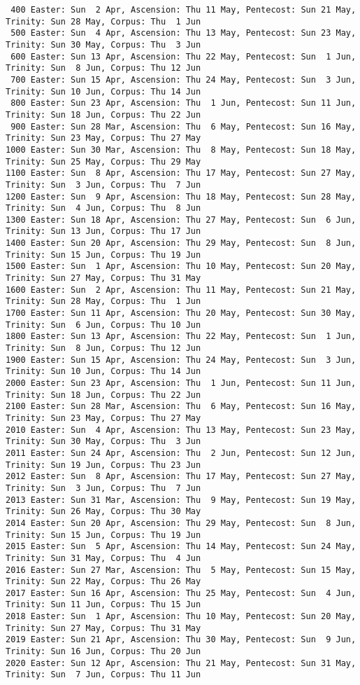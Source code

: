 \begin{verbatim}
 400 Easter: Sun  2 Apr, Ascension: Thu 11 May, Pentecost: Sun 21 May, Trinity: Sun 28 May, Corpus: Thu  1 Jun
 500 Easter: Sun  4 Apr, Ascension: Thu 13 May, Pentecost: Sun 23 May, Trinity: Sun 30 May, Corpus: Thu  3 Jun
 600 Easter: Sun 13 Apr, Ascension: Thu 22 May, Pentecost: Sun  1 Jun, Trinity: Sun  8 Jun, Corpus: Thu 12 Jun
 700 Easter: Sun 15 Apr, Ascension: Thu 24 May, Pentecost: Sun  3 Jun, Trinity: Sun 10 Jun, Corpus: Thu 14 Jun
 800 Easter: Sun 23 Apr, Ascension: Thu  1 Jun, Pentecost: Sun 11 Jun, Trinity: Sun 18 Jun, Corpus: Thu 22 Jun
 900 Easter: Sun 28 Mar, Ascension: Thu  6 May, Pentecost: Sun 16 May, Trinity: Sun 23 May, Corpus: Thu 27 May
1000 Easter: Sun 30 Mar, Ascension: Thu  8 May, Pentecost: Sun 18 May, Trinity: Sun 25 May, Corpus: Thu 29 May
1100 Easter: Sun  8 Apr, Ascension: Thu 17 May, Pentecost: Sun 27 May, Trinity: Sun  3 Jun, Corpus: Thu  7 Jun
1200 Easter: Sun  9 Apr, Ascension: Thu 18 May, Pentecost: Sun 28 May, Trinity: Sun  4 Jun, Corpus: Thu  8 Jun
1300 Easter: Sun 18 Apr, Ascension: Thu 27 May, Pentecost: Sun  6 Jun, Trinity: Sun 13 Jun, Corpus: Thu 17 Jun
1400 Easter: Sun 20 Apr, Ascension: Thu 29 May, Pentecost: Sun  8 Jun, Trinity: Sun 15 Jun, Corpus: Thu 19 Jun
1500 Easter: Sun  1 Apr, Ascension: Thu 10 May, Pentecost: Sun 20 May, Trinity: Sun 27 May, Corpus: Thu 31 May
1600 Easter: Sun  2 Apr, Ascension: Thu 11 May, Pentecost: Sun 21 May, Trinity: Sun 28 May, Corpus: Thu  1 Jun
1700 Easter: Sun 11 Apr, Ascension: Thu 20 May, Pentecost: Sun 30 May, Trinity: Sun  6 Jun, Corpus: Thu 10 Jun
1800 Easter: Sun 13 Apr, Ascension: Thu 22 May, Pentecost: Sun  1 Jun, Trinity: Sun  8 Jun, Corpus: Thu 12 Jun
1900 Easter: Sun 15 Apr, Ascension: Thu 24 May, Pentecost: Sun  3 Jun, Trinity: Sun 10 Jun, Corpus: Thu 14 Jun
2000 Easter: Sun 23 Apr, Ascension: Thu  1 Jun, Pentecost: Sun 11 Jun, Trinity: Sun 18 Jun, Corpus: Thu 22 Jun
2100 Easter: Sun 28 Mar, Ascension: Thu  6 May, Pentecost: Sun 16 May, Trinity: Sun 23 May, Corpus: Thu 27 May
2010 Easter: Sun  4 Apr, Ascension: Thu 13 May, Pentecost: Sun 23 May, Trinity: Sun 30 May, Corpus: Thu  3 Jun
2011 Easter: Sun 24 Apr, Ascension: Thu  2 Jun, Pentecost: Sun 12 Jun, Trinity: Sun 19 Jun, Corpus: Thu 23 Jun
2012 Easter: Sun  8 Apr, Ascension: Thu 17 May, Pentecost: Sun 27 May, Trinity: Sun  3 Jun, Corpus: Thu  7 Jun
2013 Easter: Sun 31 Mar, Ascension: Thu  9 May, Pentecost: Sun 19 May, Trinity: Sun 26 May, Corpus: Thu 30 May
2014 Easter: Sun 20 Apr, Ascension: Thu 29 May, Pentecost: Sun  8 Jun, Trinity: Sun 15 Jun, Corpus: Thu 19 Jun
2015 Easter: Sun  5 Apr, Ascension: Thu 14 May, Pentecost: Sun 24 May, Trinity: Sun 31 May, Corpus: Thu  4 Jun
2016 Easter: Sun 27 Mar, Ascension: Thu  5 May, Pentecost: Sun 15 May, Trinity: Sun 22 May, Corpus: Thu 26 May
2017 Easter: Sun 16 Apr, Ascension: Thu 25 May, Pentecost: Sun  4 Jun, Trinity: Sun 11 Jun, Corpus: Thu 15 Jun
2018 Easter: Sun  1 Apr, Ascension: Thu 10 May, Pentecost: Sun 20 May, Trinity: Sun 27 May, Corpus: Thu 31 May
2019 Easter: Sun 21 Apr, Ascension: Thu 30 May, Pentecost: Sun  9 Jun, Trinity: Sun 16 Jun, Corpus: Thu 20 Jun
2020 Easter: Sun 12 Apr, Ascension: Thu 21 May, Pentecost: Sun 31 May, Trinity: Sun  7 Jun, Corpus: Thu 11 Jun

\end{verbatim}


